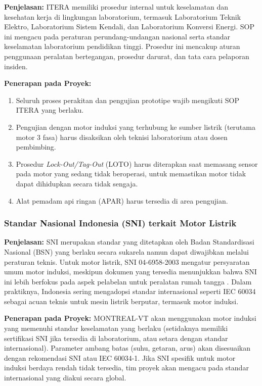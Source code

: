 \documentclass{elsinta}
\begin{document}
\textbf{Penjelasan:} ITERA memiliki prosedur internal untuk keselamatan dan kesehatan kerja di lingkungan laboratorium, termasuk Laboratorium Teknik Elektro, Laboratorium Sistem Kendali, dan Laboratorium Konversi Energi. SOP ini mengacu pada peraturan perundang-undangan nasional serta standar keselamatan laboratorium pendidikan tinggi. Prosedur ini mencakup aturan penggunaan peralatan bertegangan, prosedur darurat, dan tata cara pelaporan insiden.

\textbf{Penerapan pada Proyek:}
\begin{enumerate}
    \item Seluruh proses perakitan dan pengujian prototipe wajib mengikuti SOP ITERA yang berlaku.
    \item Pengujian dengan motor induksi yang terhubung ke sumber listrik (terutama motor 3 fasa) harus disaksikan oleh teknisi laboratorium atau dosen pembimbing.
    \item Prosedur \textit{Lock-Out/Tag-Out} (LOTO) harus diterapkan saat memasang sensor pada motor yang sedang tidak beroperasi, untuk memastikan motor tidak dapat dihidupkan secara tidak sengaja.
    \item Alat pemadam api ringan (APAR) harus tersedia di area pengujian.
\end{enumerate}

\subsubsection{Standar Nasional Indonesia (SNI) terkait Motor Listrik}

\textbf{Penjelasan:} SNI merupakan standar yang ditetapkan oleh Badan Standardisasi Nasional (BSN) yang berlaku secara sukarela namun dapat diwajibkan melalui peraturan teknis. Untuk motor listrik, SNI 04-6958-2003 mengatur persyaratan umum motor induksi, meskipun dokumen yang tersedia menunjukkan bahwa SNI ini lebih berfokus pada aspek pelabelan untuk peralatan rumah tangga \cite{sni_6958_2003}. Dalam praktiknya, Indonesia sering mengadopsi standar internasional seperti IEC 60034 sebagai acuan teknis untuk mesin listrik berputar, termasuk motor induksi.

\textbf{Penerapan pada Proyek:} MONTREAL-VT akan menggunakan motor induksi yang memenuhi standar keselamatan yang berlaku (setidaknya memiliki sertifikasi SNI jika tersedia di laboratorium, atau setara dengan standar internasional). Parameter ambang batas (suhu, getaran, arus) akan disesuaikan dengan rekomendasi SNI atau IEC 60034-1. Jika SNI spesifik untuk motor induksi berdaya rendah tidak tersedia, tim proyek akan mengacu pada standar internasional yang diakui secara global.
\end{document}
